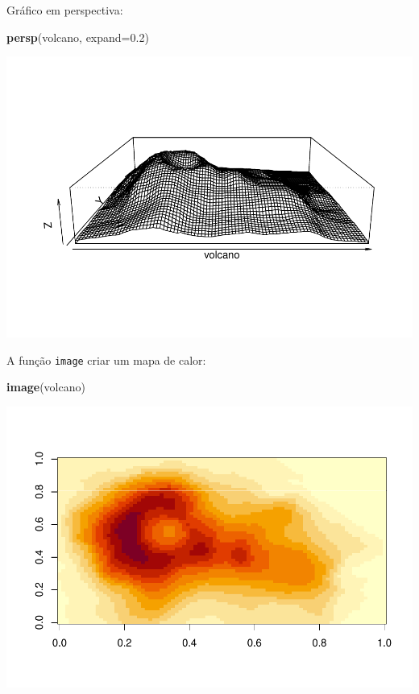 \documentclass[]{book}
\newenvironment{Shaded}{\begin{snugshade}}{\end{snugshade}}
\newcommand{\DataTypeTok}[1]{\textcolor[rgb]{0.13,0.29,0.53}{#1}}
\newcommand{\FloatTok}[1]{\textcolor[rgb]{0.00,0.00,0.81}{#1}}
\newcommand{\KeywordTok}[1]{\textcolor[rgb]{0.13,0.29,0.53}{\textbf{#1}}}
\newcommand{\NormalTok}[1]{#1}
\begin{document}
Gráfico em perspectiva:

\begin{Shaded}
\begin{Highlighting}[]
\KeywordTok{persp}\NormalTok{(volcano, }\DataTypeTok{expand=}\FloatTok{0.2}\NormalTok{)}
\end{Highlighting}
\end{Shaded}

\includegraphics{TudodoR_files/figure-latex/unnamed-chunk-75-1.pdf}

A função \texttt{image} criar um mapa de calor:

\begin{Shaded}
\begin{Highlighting}[]
\KeywordTok{image}\NormalTok{(volcano)}
\end{Highlighting}
\end{Shaded}

\includegraphics{TudodoR_files/figure-latex/unnamed-chunk-76-1.pdf}
\end{document}
